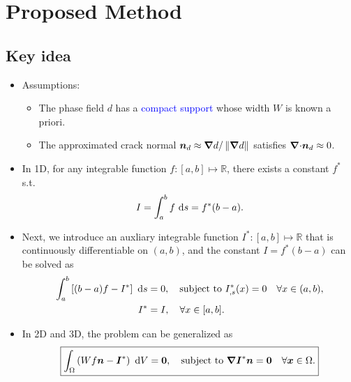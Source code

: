 \section{Proposed Method}

\sectioncover

\subsection{Key idea}

\begin{frame}
    \begin{itemize}
        \item Assumptions:
              \begin{itemize}
                  \item The phase field $d$ has a \textcolor{blue}{compact support} whose width $W$ is known a priori.
                  \item The approximated crack normal $\boldsymbol{n}_d \approx \boldsymbol{\nabla} d / \left\lVert\boldsymbol{\nabla} d\right\rVert$ satisfies \textcolor{blue}{${\boldsymbol{\nabla} \cdot} \boldsymbol{n}_d \approx 0$}.
              \end{itemize}
        \item In 1D, for any integrable function $f: [a,b] \mapsto \mathbb{R}$, there exists a constant $f^*$ s.t.
              \begin{align*}
                  I = \int_a^b f \text{ d}{s} = f^* (b-a).
              \end{align*}
        \item Next, we introduce an auxliary integrable function $I^*: [a,b] \mapsto \mathbb{R}$ that is continuously differentiable on $(a,b)$, and the constant $I = f^*(b-a)$ can be solved as
              \begin{align*}
                  \int_a^b \left[ (b-a) f - I^* \right] \text{ d}{s} & = 0, \quad \text{subject to } I^*_{,s}(x) = 0 \quad \forall x \in (a,b), \\
                  I^*                                            & = I, \quad \forall x \in [a, b].
              \end{align*}
        \item In 2D and 3D, the problem can be generalized as
              \begin{equation*}
                  \boxed{\int_\Omega \left( W f \boldsymbol{n} - \boldsymbol{I}^* \right) \text{ d}{V} = \boldsymbol{0}, \quad \text{subject to } \boldsymbol{\nabla} \boldsymbol{I}^* \boldsymbol{n} = \boldsymbol{0} \quad \forall \boldsymbol{x} \in \Omega.}
              \end{equation*}
    \end{itemize}
\end{frame}

